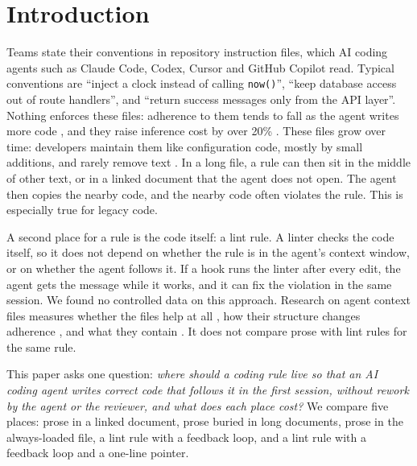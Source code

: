 \documentclass[pdflatex,sn-basic]{sn-jnl}
\begin{document}
\section{Introduction}
\label{sec:intro}

Teams state their conventions in repository instruction files, which AI coding agents such as Claude Code, Codex, Cursor and GitHub Copilot read.
Typical conventions are ``inject a clock instead of calling \texttt{now()}'', ``keep database access out of route handlers'', and ``return success messages only from the API layer''.
Nothing enforces these files: adherence to them tends to fall as the agent writes more code \citep{mcmillan2026adherence}, and they raise inference cost by over 20\% \citep{gloaguen2026agentsmd}.
These files grow over time: developers maintain them like configuration code, mostly by small additions, and rarely remove text \citep{chatlatanagulchai2025agentreadmes}.
In a long file, a rule can then sit in the middle of other text, or in a linked document that the agent does not open.
The agent then copies the nearby code, and the nearby code often violates the rule.
This is especially true for legacy code.

A second place for a rule is the code itself: a lint rule.
A linter checks the code itself, so it does not depend on whether the rule is in the agent's context window, or on whether the agent follows it.
If a hook runs the linter after every edit, the agent gets the message while it works, and it can fix the violation in the same session.
We found no controlled data on this approach.
Research on agent context files measures whether the files help at all \citep{gloaguen2026agentsmd,khatri2026contextfiles}, how their structure changes adherence \citep{mcmillan2026adherence}, and what they contain \citep{chatlatanagulchai2025agentreadmes}.
It does not compare prose with lint rules for the same rule.

This paper asks one question:
\emph{where should a coding rule live so that an AI coding agent writes correct code that follows it in the first session, without rework by the agent or the reviewer, and what does each place cost?}
We compare five places: prose in a linked document, prose buried in long documents, prose in the always-loaded file, a lint rule with a feedback loop, and a lint rule with a feedback loop and a one-line pointer.
\end{document}
